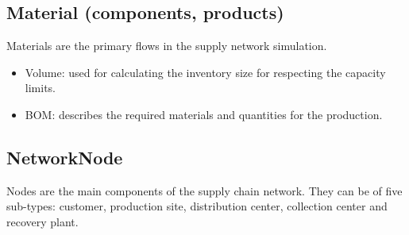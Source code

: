 \documentclass{article}
\begin{document}
\subsection{Material (components, products)}

Materials are the primary flows in the supply network simulation.
\begin{itemize}
\item Volume: used for calculating the inventory size for respecting the capacity limits.
\item BOM: describes the required materials and quantities for the production.
\end{itemize}

\subsection{NetworkNode}

Nodes are the main components of the supply chain network. They can be of five sub-types: customer, production site, distribution center, collection center and recovery plant.
\end{document}
